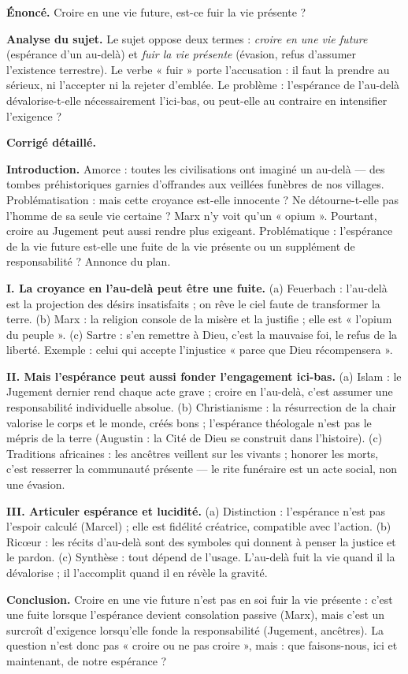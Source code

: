 \documentclass[11pt]{article}
\begin{document}
\begin{exoresolu}
\textbf{Énoncé.} Croire en une vie future, est-ce fuir la vie présente ?

\textbf{Analyse du sujet.} Le sujet oppose deux termes : \emph{croire en une vie future} (espérance d'un au-delà) et \emph{fuir la vie présente} (évasion, refus d'assumer l'existence terrestre). Le verbe « fuir » porte l'accusation : il faut la prendre au sérieux, ni l'accepter ni la rejeter d'emblée. Le problème : l'espérance de l'au-delà dévalorise-t-elle nécessairement l'ici-bas, ou peut-elle au contraire en intensifier l'exigence ?

\tcblower
\textbf{Corrigé détaillé.}

\textbf{Introduction.} Amorce : toutes les civilisations ont imaginé un au-delà — des tombes préhistoriques garnies d'offrandes aux veillées funèbres de nos villages. Problématisation : mais cette croyance est-elle innocente ? Ne détourne-t-elle pas l'homme de sa seule vie certaine ? Marx n'y voit qu'un « opium ». Pourtant, croire au Jugement peut aussi rendre plus exigeant. Problématique : l'espérance de la vie future est-elle une fuite de la vie présente ou un supplément de responsabilité ? Annonce du plan.

\textbf{I. La croyance en l'au-delà peut être une fuite.} (a) Feuerbach : l'au-delà est la projection des désirs insatisfaits ; on rêve le ciel faute de transformer la terre. (b) Marx : la religion console de la misère et la justifie ; elle est « l'opium du peuple ». (c) Sartre : s'en remettre à Dieu, c'est la mauvaise foi, le refus de la liberté. Exemple : celui qui accepte l'injustice « parce que Dieu récompensera ».

\textbf{II. Mais l'espérance peut aussi fonder l'engagement ici-bas.} (a) Islam : le Jugement dernier rend chaque acte grave ; croire en l'au-delà, c'est assumer une responsabilité individuelle absolue. (b) Christianisme : la résurrection de la chair valorise le corps et le monde, créés bons ; l'espérance théologale n'est pas le mépris de la terre (Augustin : la Cité de Dieu se construit dans l'histoire). (c) Traditions africaines : les ancêtres veillent sur les vivants ; honorer les morts, c'est resserrer la communauté présente — le rite funéraire est un acte social, non une évasion.

\textbf{III. Articuler espérance et lucidité.} (a) Distinction : l'espérance n'est pas l'espoir calculé (Marcel) ; elle est fidélité créatrice, compatible avec l'action. (b) Ricœur : les récits d'au-delà sont des symboles qui donnent à penser la justice et le pardon. (c) Synthèse : tout dépend de l'usage. L'au-delà fuit la vie quand il la dévalorise ; il l'accomplit quand il en révèle la gravité.

\textbf{Conclusion.} Croire en une vie future n'est pas en soi fuir la vie présente : c'est une fuite lorsque l'espérance devient consolation passive (Marx), mais c'est un surcroît d'exigence lorsqu'elle fonde la responsabilité (Jugement, ancêtres). La question n'est donc pas « croire ou ne pas croire », mais : que faisons-nous, ici et maintenant, de notre espérance ?
\end{exoresolu}
\end{document}
